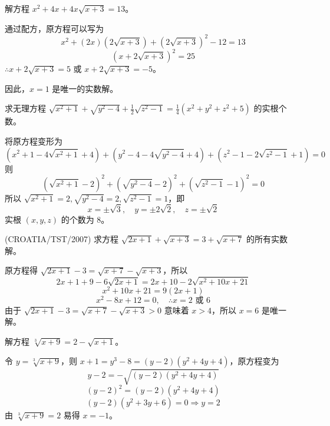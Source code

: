 \begin{questions}
\question
解方程 $x^2+4x+4x\sqrt{x+3}=13$。
\begin{solution}
通过配方，原方程可以写为
\[
x^2+(2x)\left(2\sqrt{x+3}\right)+\left(2\sqrt{x+3}\right)^2-12=13
\]
\[
\left(x+2\sqrt{x+3}\right)^2=25
\]
$\therefore x+2\sqrt{x+3}=5$ 或 $x+2\sqrt{x+3}=-5$。
因此，$x=1$ 是唯一的实数解。
\end{solution}

\question
求无理方程 $\sqrt{x^2+1}+\sqrt{y^2-4}+\frac{1}{2}\sqrt{z^2-1}=\frac{1}{4}\left(x^2+y^2+z^2+5\right)$ 的实根个数。
\begin{solution}
将原方程变形为
\[
(x^2+1-4\sqrt{x^2+1}+4)+(y^2-4-4\sqrt{y^2-4}+4)+(z^2-1-2\sqrt{z^2-1}+1)=0
\]
则
\[
\left(\sqrt{x^2+1}-2\right)^2+\left(\sqrt{y^2-4}-2\right)^2+\left(\sqrt{z^2-1}-1\right)^2=0
\]
所以 $\sqrt{x^2+1}=2, \sqrt{y^2-4}=2, \sqrt{z^2-1}=1$，即
\[
x=\pm\sqrt{3}, \quad y=\pm2\sqrt{2}, \quad z=\pm\sqrt{2}
\]
实根 $(x, y, z)$ 的个数为 8。
\end{solution}

\question
(CROATIA/TST/2007) 求方程 $\sqrt{2x+1}+\sqrt{x+3}=3+\sqrt{x+7}$ 的所有实数解。
\begin{solution}
原方程得 $\sqrt{2x+1}-3=\sqrt{x+7}-\sqrt{x+3}$，所以
\[
2x+1+9-6\sqrt{2x+1}=2x+10-2\sqrt{x^2+10x+21}
\]
\[
x^2+10x+21=9(2x+1)
\]
\[
x^2-8x+12=0, \quad \therefore x=2 \text{ 或 } 6
\]
由于 $\sqrt{2x+1}-3=\sqrt{x+7}-\sqrt{x+3}>0$ 意味着 $x>4$，所以 $x=6$ 是唯一解。
\end{solution}

\question
解方程 $\sqrt[3]{x+9}=2-\sqrt{x+1}$。
\begin{solution}
令 $y=\sqrt[3]{x+9}$，则 $x+1=y^3-8=(y-2)\left(y^2+4y+4\right)$，原方程变为
\[
y-2=-\sqrt{(y-2)\left(y^2+4y+4\right)}
\]
\[
(y-2)^2=(y-2)\left(y^2+4y+4\right)
\]
\[
(y-2)\left(y^2+3y+6\right)=0 \Rightarrow y=2
\]
由 $\sqrt[3]{x+9}=2$ 易得 $x=-1$。
\end{solution}


\end{questions}
